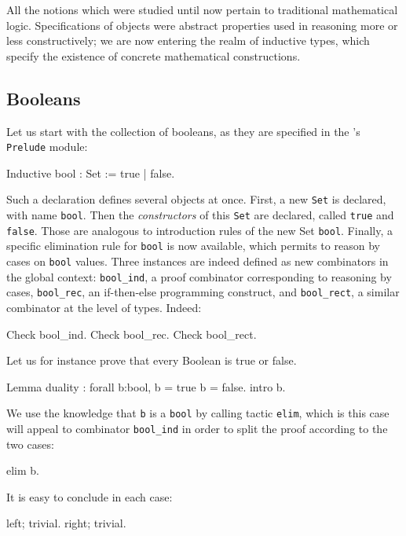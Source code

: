 \documentclass[11pt,a4paper]{book}
\begin{document}
All the notions which were studied until now pertain to traditional
mathematical logic. Specifications of objects were abstract properties
used in reasoning more or less constructively; we are now entering
the realm of inductive types, which specify the existence of concrete
mathematical constructions.

\subsection{Booleans}

Let us start with the collection of booleans, as they are specified
in the \Coq's \verb:Prelude: module: 
\begin{coq_example}
Inductive bool :  Set := true | false.
\end{coq_example}

Such a declaration defines several objects at once. First, a new
\verb:Set: is declared, with name \verb:bool:. Then the {\sl constructors}
of this \verb:Set: are declared, called \verb:true: and \verb:false:.
Those are analogous to introduction rules of the new Set \verb:bool:.
Finally, a specific elimination rule for \verb:bool: is now available, which
permits to reason by cases on \verb:bool: values. Three instances are
indeed defined as new combinators in the global context: \verb:bool_ind:,
a proof combinator corresponding to reasoning by cases,
\verb:bool_rec:, an if-then-else programming construct,
and \verb:bool_rect:, a similar combinator at the level of types.
Indeed:
\begin{coq_example}
Check bool_ind.
Check bool_rec.
Check bool_rect.
\end{coq_example}

Let us for instance prove that every Boolean is true or false.
\begin{coq_example}
Lemma duality : forall b:bool, b = true \/ b = false.
intro b.
\end{coq_example}

We use the knowledge that \verb:b: is a \verb:bool: by calling tactic
\verb:elim:, which is this case will appeal to combinator \verb:bool_ind:
in order to split the proof according to the two cases:
\begin{coq_example}
elim b.
\end{coq_example}

It is easy to conclude in each case:
\begin{coq_example}
left; trivial.
right; trivial.
\end{coq_example}
\end{document}
